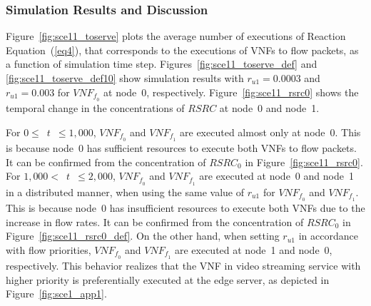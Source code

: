 \documentclass[technicalreport]{ieicej}
\begin{document}
	\subsubsection{Simulation Results and Discussion}
	Figure~\ref{fig:sce11_toserve} plots the average number of executions of Reaction Equation~(\ref{eq4}), that corresponds to the executions of VNFs to flow packets, as a function of simulation time step.
	Figures~\ref{fig:sce11_toserve_def} and \ref{fig:sce11_toserve_def10} show simulation results with $\mathit{r_{u1}}=0.0003$ and $\mathit{r_{u1}}=0.003$ for $\mathit{VNF_{f_0}}$ at node~0, respectively.
	Figure~\ref{fig:sce11_rsrc0} shows the temporal change in the concentrations of $\mathit{RSRC}$ at node~0 and node~1.

	For $0\le$~$t$~$\le1,000$, $\mathit{VNF_{f_0}}$ and $\mathit{VNF_{f_1}}$ are executed almost only at node~0.
	This is because node~0 has sufficient resources to execute both VNFs to flow packets.
	It can be confirmed from the concentration of $\mathit{RSRC_0}$ in Figure~\ref{fig:sce11_rsrc0}.
	For $1,000<$~$t$~$\le2,000$, $\mathit{VNF_{f_0}}$ and $\mathit{VNF_{f_1}}$ are executed at node~0 and node~1 in a distributed manner, when using the same value of $\mathit{r_{u1}}$ for $\mathit{VNF_{f_0}}$ and $\mathit{VNF_{f_1}}$.
	This is because node~0 has insufficient resources to execute both VNFs due to the increase in flow rates.
	It can be confirmed from the concentration of $\mathit{RSRC_0}$ in Figure~\ref{fig:sce11_rsrc0_def}.
	On the other hand, when setting $\mathit{r_{u1}}$ in accordance with flow priorities, $\mathit{VNF_{f_0}}$ and $\mathit{VNF_{f_1}}$ are executed at node~1 and node~0, respectively.
	This behavior realizes that the VNF in video streaming service with higher priority is preferentially executed at the edge server, as depicted in Figure~\ref{fig:sce1_app1}.
\end{document}
